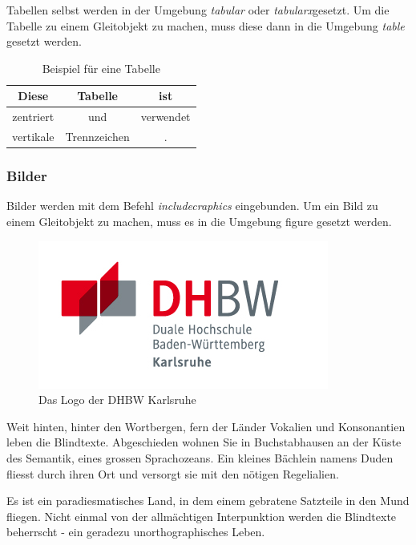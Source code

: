 Tabellen selbst werden in der Umgebung \textit{tabular} oder \textit{tabularx}gesetzt. Um die Tabelle zu einem Gleitobjekt zu machen, muss diese dann in die Umgebung \textit{table} gesetzt werden. 

\begin{table}[hbt]
\centering
\begin{tabular}{c|c|c}
\hline Diese & Tabelle & ist \\ 
\hline zentriert & und  & verwendet \\ 
\hline vertikale & Trennzeichen &  .\\ 
\hline 
\end{tabular}
\caption{Beispiel für eine Tabelle} 

\end{table}


\subsubsection{Bilder}

Bilder werden mit dem Befehl \textit{\bs includecraphics} eingebunden. Um ein Bild zu einem Gleitobjekt zu machen, muss es in die Umgebung figure gesetzt werden.

\begin{figure}[hbt]
\centering
\includegraphics[scale=2.0]{Bilder/logo_dhbw}
\caption{Das Logo der DHBW Karlsruhe}
\end{figure}

Weit hinten, hinter den Wortbergen, fern der Länder Vokalien und Konsonantien leben die Blindtexte. Abgeschieden wohnen Sie in Buchstabhausen an der Küste des Semantik, eines grossen Sprachozeans. Ein kleines Bächlein namens Duden fliesst durch ihren Ort und versorgt sie mit den nötigen Regelialien.

Es ist ein paradiesmatisches Land, in dem einem gebratene Satzteile in den Mund fliegen. Nicht einmal von der allmächtigen Interpunktion werden die Blindtexte beherrscht - ein geradezu unorthographisches Leben.

